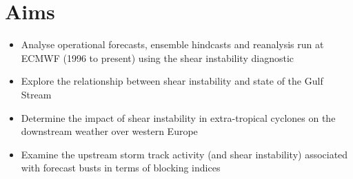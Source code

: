 %

\section{Aims}
\begin{itemize}
	\item Analyse operational forecasts, ensemble hindcasts and reanalysis run at ECMWF (1996 to present) using the shear instability diagnostic
	\item Explore the relationship between shear instability and state of the Gulf Stream
	\item Determine the impact of shear instability in extra-tropical cyclones on the downstream weather over western Europe
	\item Examine the upstream storm track activity (and shear instability) associated with forecast busts in terms of blocking indices
\end{itemize}






